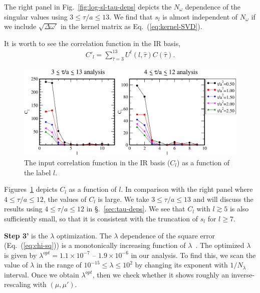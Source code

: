 \documentclass[a4paper,11pt]{article}
\newcommand\beq{ \begin{eqnarray} }
\newcommand\eeq{ \end{eqnarray} }
\begin{document}
The right panel in Fig.~\ref{fig:log-sl-tau-deps} depicts the $N_\omega$ dependence of the singular values using $3 \le \tau/a \le 13$.
We find that $s_l$ is almost independent of $N_\omega$ if we include $\sqrt{\Delta \omega'}$ in the kernel matrix as Eq.~(\ref{eq:kernel-SVD}).

It is worth to see the correlation function in the IR basis, 
\beq
C'_l = \sum_{\hat{\tau}=3}^{13} U^{t}(l,\hat{\tau}) C(\hat{\tau}) .
\eeq
\begin{figure}[h]
\begin{center}
\includegraphics[scale=0.5]{./Center-Cl-ft-tau-deps.pdf}
\caption{The input correlation function in the IR basis ($C_l$) as a function of the label $l$.   }
\label{fig:Cl-ft-deps}
\end{center}
\end{figure}
Figures~\ref{fig:Cl-ft-deps} depicts $C_l$ as a function of $l$.
In comparison with the right panel where $4 \le \tau/a \le 12$, the values of $C_l$ is large.
We take  $3 \le \tau/a \le 13$ and will discuss the results using  $4 \le \tau/a \le 12$ in \S.~\ref{sec:tau-deps}.
We see that $C_l$ with $l \gtrsim 5$ is also sufficiently small, so that it is consistent with the truncation of $s_l$ for $l \ge 7$.


{\bf Step 3'} is the $\lambda$ optimization.
The $\lambda$ dependence of the square error (Eq.~(\ref{eq:chi-sq})) is a monotonically increasing function of $\lambda$~\cite{Shinaoka2017b}.
The optimized $\lambda$ is given by $\lambda^{opt}=1.1 \times 10^{-7}$ -- $1.9 \times 10^{-6}$ in our analysis.
To find this, we scan the value of $\lambda$ in the range of $ 10^{-15} \le \lambda \le 10^{2}$ by changing its exponent with $1 /N_\lambda$ interval.
Once we obtain $\lambda^{opt}$, then we check  whether it shows roughly an inverse-rescaling with $(\mu,\mu')$.
\end{document}
